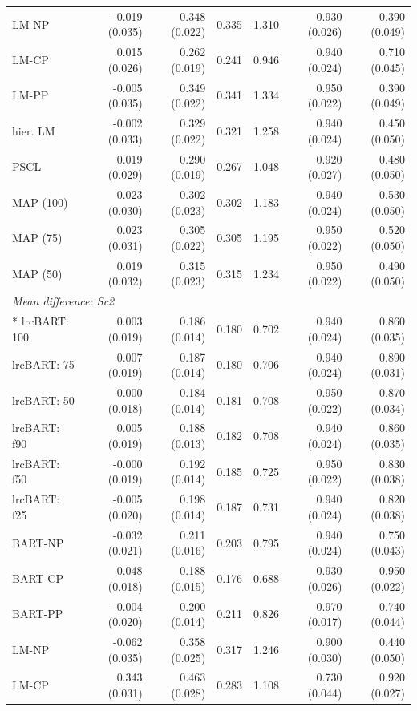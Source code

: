 \begin{landscape}
\begin{longtable}{lrrrrrr}
LM-NP & -0.019 (0.035) & 0.348 (0.022) & 0.335 & 1.310 & 0.930 (0.026) & 0.390 (0.049) \\
LM-CP & 0.015 (0.026) & 0.262 (0.019) & 0.241 & 0.946 & 0.940 (0.024) & 0.710 (0.045) \\
LM-PP & -0.005 (0.035) & 0.349 (0.022) & 0.341 & 1.334 & 0.950 (0.022) & 0.390 (0.049) \\
hier. LM & -0.002 (0.033) & 0.329 (0.022) & 0.321 & 1.258 & 0.940 (0.024) & 0.450 (0.050) \\
PSCL & 0.019 (0.029) & 0.290 (0.019) & 0.267 & 1.048 & 0.920 (0.027) & 0.480 (0.050) \\
MAP (100) & 0.023 (0.030) & 0.302 (0.023) & 0.302 & 1.183 & 0.940 (0.024) & 0.530 (0.050) \\
MAP (75) & 0.023 (0.031) & 0.305 (0.022) & 0.305 & 1.195 & 0.950 (0.022) & 0.520 (0.050) \\
MAP (50) & 0.019 (0.032) & 0.315 (0.023) & 0.315 & 1.234 & 0.950 (0.022) & 0.490 (0.050) \\
\multicolumn{7}{l}{\strut\textit{Mean difference: Sc2}}\\*
lrcBART: 100 & 0.003 (0.019) & 0.186 (0.014) & 0.180 & 0.702 & 0.940 (0.024) & 0.860 (0.035) \\
lrcBART: 75 & 0.007 (0.019) & 0.187 (0.014) & 0.180 & 0.706 & 0.940 (0.024) & 0.890 (0.031) \\
lrcBART: 50 & 0.000 (0.018) & 0.184 (0.014) & 0.181 & 0.708 & 0.950 (0.022) & 0.870 (0.034) \\
lrcBART: f90 & 0.005 (0.019) & 0.188 (0.013) & 0.182 & 0.708 & 0.940 (0.024) & 0.860 (0.035) \\
lrcBART: f50 & -0.000 (0.019) & 0.192 (0.014) & 0.185 & 0.725 & 0.950 (0.022) & 0.830 (0.038) \\
lrcBART: f25 & -0.005 (0.020) & 0.198 (0.014) & 0.187 & 0.731 & 0.940 (0.024) & 0.820 (0.038) \\
BART-NP & -0.032 (0.021) & 0.211 (0.016) & 0.203 & 0.795 & 0.940 (0.024) & 0.750 (0.043) \\
BART-CP & 0.048 (0.018) & 0.188 (0.015) & 0.176 & 0.688 & 0.930 (0.026) & 0.950 (0.022) \\
BART-PP & -0.004 (0.020) & 0.200 (0.014) & 0.211 & 0.826 & 0.970 (0.017) & 0.740 (0.044) \\
LM-NP & -0.062 (0.035) & 0.358 (0.025) & 0.317 & 1.246 & 0.900 (0.030) & 0.440 (0.050) \\
LM-CP & 0.343 (0.031) & 0.463 (0.028) & 0.283 & 1.108 & 0.730 (0.044) & 0.920 (0.027) \\

\end{longtable}
\end{landscape}
